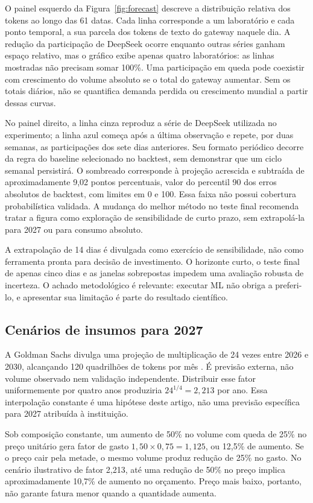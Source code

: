 \documentclass[11pt,a4paper]{article}
\begin{document}
O painel esquerdo da Figura~\ref{fig:forecast} descreve a distribuição relativa dos tokens ao longo das 61 datas. Cada linha corresponde a um laboratório e cada ponto temporal, a sua parcela dos tokens de texto do gateway naquele dia. A redução da participação de DeepSeek ocorre enquanto outras séries ganham espaço relativo, mas o gráfico exibe apenas quatro laboratórios: as linhas mostradas não precisam somar 100\%. Uma participação em queda pode coexistir com crescimento do volume absoluto se o total do gateway aumentar. Sem os totais diários, não se quantifica demanda perdida ou crescimento mundial a partir dessas curvas.

No painel direito, a linha cinza reproduz a série de DeepSeek utilizada no experimento; a linha azul começa após a última observação e repete, por duas semanas, as participações dos sete dias anteriores. Seu formato periódico decorre da regra do baseline selecionado no backtest, sem demonstrar que um ciclo semanal persistirá. O sombreado corresponde à projeção acrescida e subtraída de aproximadamente 9,02 pontos percentuais, valor do percentil 90 dos erros absolutos de backtest, com limites em 0 e 100. Essa faixa não possui cobertura probabilística validada. A mudança do melhor método no teste final recomenda tratar a figura como exploração de sensibilidade de curto prazo, sem extrapolá-la para 2027 ou para consumo absoluto.

A extrapolação de 14 dias é divulgada como exercício de sensibilidade, não como ferramenta pronta para decisão de investimento. O horizonte curto, o teste final de apenas cinco dias e as janelas sobrepostas impedem uma avaliação robusta de incerteza. O achado metodológico é relevante: executar ML não obriga a preferi-lo, e apresentar sua limitação é parte do resultado científico.

\subsection{Cenários de insumos para 2027}
A Goldman Sachs divulga uma projeção de multiplicação de 24 vezes entre 2026 e 2030, alcançando 120 quadrilhões de tokens por mês \cite{goldman2026}. É previsão externa, não volume observado nem validação independente. Distribuir esse fator uniformemente por quatro anos produziria $24^{1/4}=2{,}213$ por ano. Essa interpolação constante é uma hipótese deste artigo, não uma previsão específica para 2027 atribuída à instituição.

Sob composição constante, um aumento de 50\% no volume com queda de 25\% no preço unitário gera fator de gasto $1{,}50\times0{,}75=1{,}125$, ou 12,5\% de aumento. Se o preço cair pela metade, o mesmo volume produz redução de 25\% no gasto. No cenário ilustrativo de fator 2,213, até uma redução de 50\% no preço implica aproximadamente 10,7\% de aumento no orçamento. Preço mais baixo, portanto, não garante fatura menor quando a quantidade aumenta.
\end{document}
